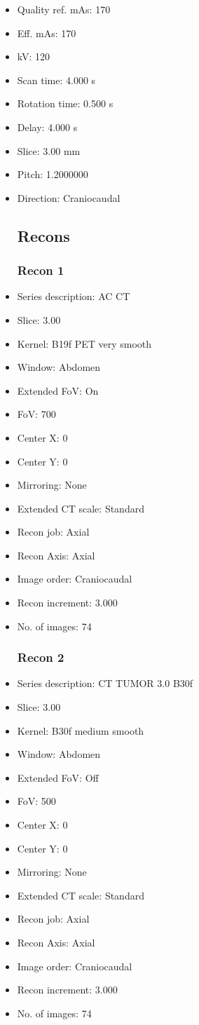 \documentclass[12pt]{article}
\begin{document}
\begin{itemize}
\subsection{Scan}
\item Quality ref. mAs: 170\item Eff. mAs: 170\item kV: 120\item Scan time: 4.000 s\item Rotation time: 0.500 s\item Delay: 4.000 s\item Slice: 3.00 mm\item Pitch: 1.2000000\item Direction: Craniocaudal\subsection{Recons}

\subsubsection{Recon 1}
\item Series description: AC CT
\item Slice: 3.00
\item Kernel: B19f PET very smooth
\item Window: Abdomen
\item Extended FoV: On
\item FoV: 700
\item Center X: 0
\item Center Y: 0
\item Mirroring: None
\item Extended CT scale: Standard
\item Recon job: Axial
\item Recon Axis: Axial
\item Image order: Craniocaudal
\item Recon increment: 3.000
\item No. of images: 74
\subsubsection{Recon 2}
\item Series description: CT TUMOR 3.0 B30f
\item Slice: 3.00
\item Kernel: B30f medium smooth
\item Window: Abdomen
\item Extended FoV: Off
\item FoV: 500
\item Center X: 0
\item Center Y: 0
\item Mirroring: None
\item Extended CT scale: Standard
\item Recon job: Axial
\item Recon Axis: Axial
\item Image order: Craniocaudal
\item Recon increment: 3.000
\item No. of images: 74

\end{itemize}
\end{document}
